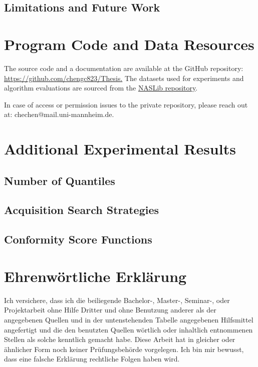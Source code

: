\documentclass[a4paper,oneside,bibliography=totoc]{scrbook}
\begin{document}
\section{Limitations and Future Work}
\label{sec: future_work}





\listofalgorithms 
\listoffigures 
\listoftables
\printglossary[type=\acronymtype, title=Acronyms]

\appendix
\chapter{Program Code and Data Resources}
The source code and a documentation are available at the GitHub repository: \url{https://github.com/chengc823/Thesis.}
The datasets used for experiments and algorithm evaluations are sourced from the \href{https://github.com/automl/NASLib/tree/Develop}{NASLib repository}.

In case of access or permission issues to the private repository, please reach out at: chechen@mail.uni-mannheim.de.

\chapter{Additional Experimental Results}
\section{Number of Quantiles}
\label{appendix: s1}
\section{Acquisition Search Strategies}
\label{appendix: s2}
\section{Conformity Score Functions}
\label{appendix: s3}




\backmatter
\chapter{Ehrenwörtliche Erklärung}
Ich versichere, dass ich die beiliegende Bachelor-, Master-, Seminar-, oder
Projektarbeit ohne Hilfe Dritter und ohne Benutzung anderer als der angegebenen
Quellen und in der untenstehenden Tabelle angegebenen Hilfsmittel angefertigt
und die den benutzten Quellen wörtlich oder inhaltlich entnommenen Stellen als
solche kenntlich gemacht habe. Diese Arbeit hat in gleicher oder ähnlicher Form
noch keiner Prüfungsbehörde vorgelegen. Ich bin mir bewusst, dass eine falsche
Erklärung rechtliche Folgen haben wird.
\end{document}
